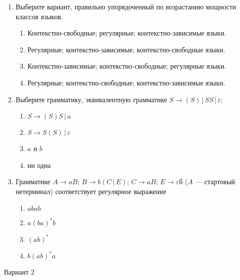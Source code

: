 \documentclass[12pt]{article}
\begin{document}
\begin{enumerate}
    \item Выберите вариант, правильно упорядоченный по возрастанию мощности классов языков.
    \begin{enumerate}
        \item Контекстно-свободные; регулярные; контекстно-зависимые языки.
        \item Регулярные; контекстно-зависимые; контекстно-свободные языки.
        \item Контекстно-зависимые; контекстно-свободные; регулярные языки.
        \item Регулярные; контекстно-свободные; контекстно-зависимые языки. 
    \end{enumerate}
    
    \item Выберите грамматику, эквивалентную грамматике $S \rightarrow ( S ) \, | \, S S \, | \, \varepsilon $:
    \begin{enumerate}
        \item $S \rightarrow ( S ) S \, | \, a $ 
        \item $S \rightarrow S ( S ) \, | \, \varepsilon $ 
        \item $a$ и $b$
        \item ни одна
    \end{enumerate}


    \item Грамматике $A \rightarrow a B; \, B \rightarrow b (C \, | \, E); \, C \rightarrow a B; \, E \rightarrow \varepsilon$б ($A$ --- стартовый нетерминал) соответствует регулярное выражение
    \begin{enumerate}
        \item $a b a b$
        \item $a ( b a )^* b$
        \item $(a b)^*$
        \item $b (a b)^* a$
    \end{enumerate}
\end{enumerate}

\medskip
{\Large Вариант 2}
\medskip
\end{document}
